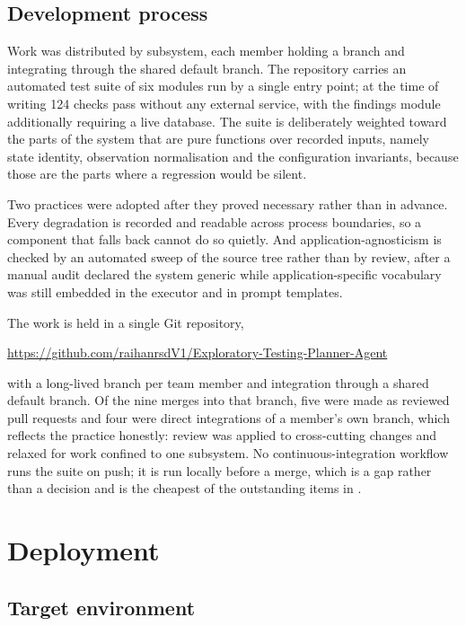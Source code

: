 \subsection{Development process}

Work was distributed by subsystem, each member holding a branch and integrating
through the shared default branch. The repository carries an automated test
suite of six modules run by a single entry point; at the time of writing 124
checks pass without any external service, with the findings module additionally
requiring a live database. The suite is deliberately weighted toward the parts
of the system that are pure functions over recorded inputs, namely state
identity, observation normalisation and the configuration invariants, because
those are the parts where a regression would be silent.

Two practices were adopted after they proved necessary rather than in advance.
Every degradation is recorded and readable across process boundaries, so a
component that falls back cannot do so quietly. And application-agnosticism is
checked by an automated sweep of the source tree rather than by review, after a
manual audit declared the system generic while application-specific vocabulary
was still embedded in the executor and in prompt templates.

The work is held in a single Git repository,

\begin{center}\small\url{https://github.com/raihanrsdV1/Exploratory-Testing-Planner-Agent}\end{center}

\noindent with a long-lived branch per team member and integration through a shared default branch. Of the nine merges into that branch, five were made as reviewed pull
requests and four were direct integrations of a member's own branch, which
reflects the practice honestly: review was applied to cross-cutting changes and
relaxed for work confined to one subsystem. No continuous-integration workflow
runs the suite on push; it is run locally before a merge, which is a gap rather
than a decision and is the cheapest of the outstanding items in
.

\section{Deployment}
\label{sec:deployment}

\subsection{Target environment}

